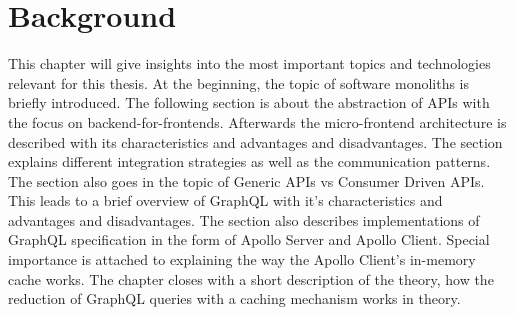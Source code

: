 \chapter{Background}\label{chapter:background}

This chapter will give insights into the most important topics and technologies relevant for this thesis. At the beginning, the topic of software monoliths is briefly introduced. The following section is about the abstraction of APIs with the focus on backend-for-frontends. Afterwards the micro-frontend architecture is described with its characteristics and advantages and disadvantages. The section explains different integration strategies as well as the communication patterns. The section also goes in the topic of Generic APIs vs Consumer Driven APIs. This leads to a brief overview of GraphQL with it's characteristics and advantages and disadvantages. The section also describes implementations of GraphQL specification in the form of Apollo Server and Apollo Client. Special importance is attached to explaining the way the Apollo Client's in-memory cache works. The chapter closes with a short description of the theory, how the reduction of GraphQL queries with a caching mechanism works in theory.










